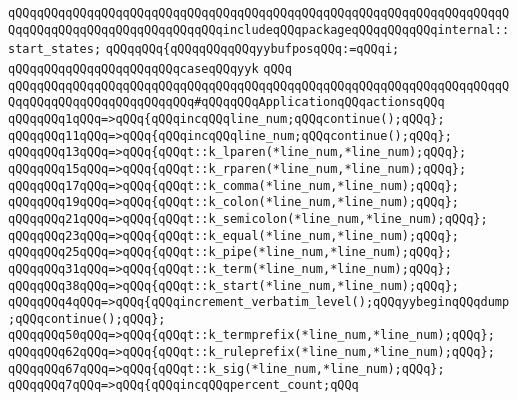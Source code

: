 \verb|qQQqqQQqqQQqqQQqqQQqqQQqqQQqqQQqqQQqqQQqqQQqqQQqqQQqqQQqqQQqqQQqqQQqqQQqqQQqqQQqqQQqqQQqqQQqqQQqqQQqincludeqQQqpackageqQQqqQQqqQQqinternal::start_states;|\newline
\verb|qQQqqQQq{qQQqqQQqqQQqyybufposqQQq:=qQQqi;|\newline
\verb|qQQqqQQqqQQqqQQqqQQqqQQqcaseqQQqyyk|\newline
\verb|qQQq|\newline
\newline
\verb|qQQqqQQqqQQqqQQqqQQqqQQqqQQqqQQqqQQqqQQqqQQqqQQqqQQqqQQqqQQqqQQqqQQqqQQqqQQqqQQqqQQqqQQqqQQqqQQq#qQQqqQQqApplicationqQQqactionsqQQq|\newline
\newline
\verb|qQQqqQQq1qQQq=>qQQq{qQQqincqQQqline_num;qQQqcontinue();qQQq};|\newline
\verb|qQQqqQQq11qQQq=>qQQq{qQQqincqQQqline_num;qQQqcontinue();qQQq};|\newline
\verb|qQQqqQQq13qQQq=>qQQq{qQQqt::k_lparen(*line_num,*line_num);qQQq};|\newline
\verb|qQQqqQQq15qQQq=>qQQq{qQQqt::k_rparen(*line_num,*line_num);qQQq};|\newline
\verb|qQQqqQQq17qQQq=>qQQq{qQQqt::k_comma(*line_num,*line_num);qQQq};|\newline
\verb|qQQqqQQq19qQQq=>qQQq{qQQqt::k_colon(*line_num,*line_num);qQQq};|\newline
\verb|qQQqqQQq21qQQq=>qQQq{qQQqt::k_semicolon(*line_num,*line_num);qQQq};|\newline
\verb|qQQqqQQq23qQQq=>qQQq{qQQqt::k_equal(*line_num,*line_num);qQQq};|\newline
\verb|qQQqqQQq25qQQq=>qQQq{qQQqt::k_pipe(*line_num,*line_num);qQQq};|\newline
\verb|qQQqqQQq31qQQq=>qQQq{qQQqt::k_term(*line_num,*line_num);qQQq};|\newline
\verb|qQQqqQQq38qQQq=>qQQq{qQQqt::k_start(*line_num,*line_num);qQQq};|\newline
\verb|qQQqqQQq4qQQq=>qQQq{qQQqincrement_verbatim_level();qQQqyybeginqQQqdump;qQQqcontinue();qQQq};|\newline
\verb|qQQqqQQq50qQQq=>qQQq{qQQqt::k_termprefix(*line_num,*line_num);qQQq};|\newline
\verb|qQQqqQQq62qQQq=>qQQq{qQQqt::k_ruleprefix(*line_num,*line_num);qQQq};|\newline
\verb|qQQqqQQq67qQQq=>qQQq{qQQqt::k_sig(*line_num,*line_num);qQQq};|\newline
\verb|qQQqqQQq7qQQq=>qQQq{qQQqincqQQqpercent_count;qQQq|\newline
